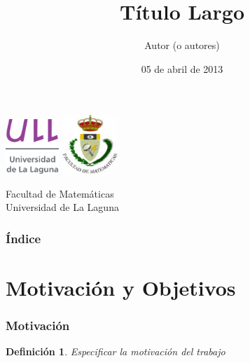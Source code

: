 \documentclass{beamer}
\title[Título corto]{Título Largo}
\author[Autor Uno]{Autor (o autores)}
\institute[ULL]{Universidad de La Laguna}
\date[05-04-2013]{05 de abril de 2013}
\newtheorem{definicion}{Definición}
\begin{document}
  
\begin{frame}

  \includegraphics[width=0.15\textwidth]{img/ullesc.eps}
  \hspace*{7.5cm}
  \includegraphics[width=0.16\textwidth]{img/fmatesc.eps}
  \titlepage

  \begin{scriptsize}
    \begin{center}
     Facultad de Matemáticas \\
     Universidad de La Laguna
    \end{center}
  \end{scriptsize}

\end{frame}

\begin{frame}
  \frametitle{Índice}  
  \tableofcontents[pausesections]
\end{frame}


\section{Motivación y Objetivos}


\begin{frame}

\frametitle{Motivación}

\begin{definicion}
Especificar la motivación del trabajo
\end{definicion}

\end{frame}
\end{document}

